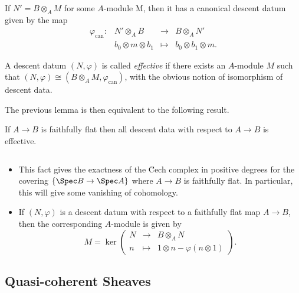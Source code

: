 If $N' = B \otimes_A M$ for some $A$-module M, then it has a canonical descent datum given by the map
$$
\begin{array}{rrcl}
 \varphi_\text{can}: & N' \otimes_A B & \to & B \otimes_A N' \\
& b_0 \otimes m \otimes b_1 & \mapsto & b_0 \otimes b_1 \otimes m.
\end{array}
$$

\begin{defi}
A descent datum $(N,\varphi)$ is called \emph{effective} if there exists an $A$-module $M$ such that $(N,\varphi) \cong (B\otimes_A M, \varphi_\text{can})$, with the obvious notion of isomorphism of descent data.
\end{defi}

The previous lemma is then equivalent to the following result.

\begin{thm}
If $A \to B$ is faithfully flat then all descent data with respect to $A\to B$ is effective. 
\end{thm}

\begin{remark}$ $
\begin{itemize}
\item
This fact gives the exactness of the \u Cech complex in positive degrees for the covering $\{ \Spec B \to \Spec A\}$ where $A \to B$ is faithfully flat. In particular, this will give some vanishing of cohomology.
\item
If $(N,\varphi)$ is a descent datum with respect to a faithfully flat map $A\to B$, then the corresponding $A$-module is given by 
$$
M = \ker \left(
\begin{array}{rcl}
N & \longrightarrow & B\otimes_A N \\
 n & \longmapsto & 1 \otimes n - \varphi(n\otimes 1)
 \end{array}
\right).
$$ 
\end{itemize}
\end{remark}

\subsection{Quasi-coherent Sheaves}

